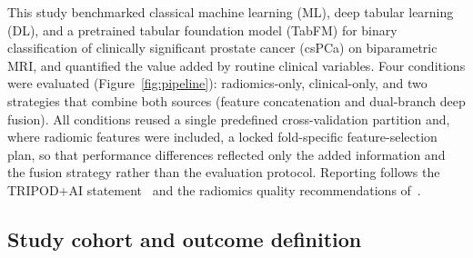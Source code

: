 \documentclass[11pt]{article}
\begin{document}
This study benchmarked classical machine learning (ML), deep tabular learning
(DL), and a pretrained tabular foundation model (TabFM) for binary
classification of clinically significant prostate cancer (csPCa) on
biparametric MRI, and quantified the value added by routine clinical variables.
Four conditions were evaluated (Figure~\ref{fig:pipeline}):
radiomics-only, clinical-only, and two strategies that combine both sources
(feature concatenation and dual-branch deep fusion). All conditions reused a
single predefined cross-validation partition and, where radiomic features were
included, a locked fold-specific feature-selection plan, so that performance
differences reflected only the added information and the fusion strategy rather
than the evaluation protocol. Reporting follows the TRIPOD+AI
statement~\citep{collins2024tripodai} and the radiomics quality
recommendations of~\citet{lambin2017radiomics}.

\subsection{Study cohort and outcome definition}
\label{sec:cohort}
\end{document}
